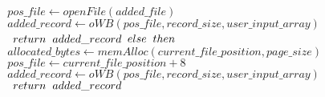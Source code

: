 \documentclass[12pt]{report}
\begin{document}
\begin{algorithm}
\begin{algorithmic}[1]
	\STATE $\hspace{1cm}pos\_file \leftarrow openFile(added\_file)$
	\STATE $\hspace{1cm}added\_record \leftarrow oWB(pos\_file, record\_size, user\_input\_array)$
	\STATE $\hspace{1cm}return\hspace{0.2cm}added\_record$
	\STATE $else\hspace{0.2cm}then$
	\STATE $\hspace{1cm}allocated\_bytes \leftarrow memAlloc(current\_file\_position, page\_size)$
	\STATE $\hspace{1cm}pos\_file \leftarrow current\_file\_position + 8$
	\STATE $\hspace{1cm}added\_record \leftarrow oWB(pos\_file, record\_size, user\_input\_array)$
	\STATE $\hspace{1cm}return\hspace{0.2cm}added\_record$
\end{algorithmic}
\end{algorithm}

\newpage
\end{document}
